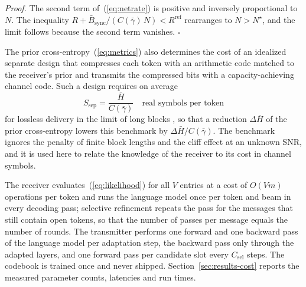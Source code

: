 \emph{Proof.} The second term of~(\ref{eq:netrate}) is positive and inversely proportional to $N$. The inequality $R + \bar{B}_\mathrm{sync}/(C(\bar{\gamma})\,N) < R^\mathrm{ref}$ rearranges to $N > N^\star$, and the limit follows because the second term vanishes. $\square$

The prior cross-entropy~(\ref{eq:metrics}) also determines the cost of an idealized separate design that compresses each token with an arithmetic code matched to the receiver's prior and transmits the compressed bits with a capacity-achieving channel code. Such a design requires on average
\begin{equation}
S_\mathrm{sep} = \frac{\bar{H}}{C(\bar{\gamma})}\quad\text{real symbols per token}
\label{eq:separation}
\end{equation}
for lossless delivery in the limit of long blocks \cite{shannon1948}, so that a reduction $\Delta\bar{H}$ of the prior cross-entropy lowers this benchmark by $\Delta\bar{H}/C(\bar{\gamma})$. The benchmark ignores the penalty of finite block lengths \cite{polyanskiy2010} and the cliff effect at an unknown SNR, and it is used here to relate the knowledge of the receiver to its cost in channel symbols.

The receiver evaluates~(\ref{eq:likelihood}) for all $V$ entries at a cost of $O(Vm)$ operations per token and runs the language model once per token and beam in every decoding pass; selective refinement repeats the pass for the messages that still contain open tokens, so that the number of passes per message equals the number of rounds. The transmitter performs one forward and one backward pass of the language model per adaptation step, the backward pass only through the adapted layers, and one forward pass per candidate slot every $C_\mathrm{sel}$ steps. The codebook is trained once and never shipped. Section~\ref{sec:results-cost} reports the measured parameter counts, latencies and run times.
